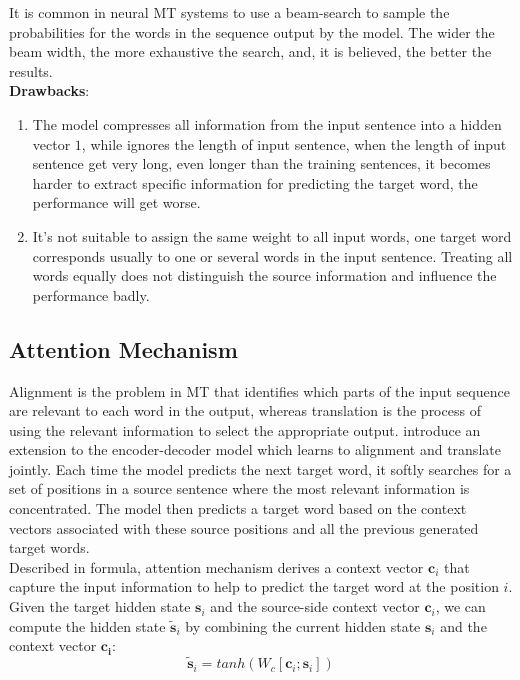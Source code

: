 It is common in neural MT systems to use a beam-search to sample the probabilities for the words in the sequence output by the model. The wider the beam width, the more exhaustive the search, and, it is believed, the better the results.\\









%
%

\textbf{Drawbacks}:
\begin{enumerate}
	\item The model compresses all information from the input sentence into a hidden vector ${1}$, while ignores the length of input sentence, when the length of input sentence get very long, even longer than the training sentences, it becomes harder to extract specific information for predicting the target word, the performance will get worse.
	\item It's not suitable to assign the same weight to all input words, one target word corresponds usually to one or several words in the input sentence. Treating all words equally does not distinguish the source information and influence the performance badly.

\end{enumerate}

\subsection{Attention Mechanism}
Alignment is the problem in MT that identifies which parts of the input sequence are relevant to each word in the output, whereas translation is the process of using the relevant information to select the appropriate output.
\cite{bahdanau2014neural} introduce an extension to the encoder-decoder model which learns to alignment and translate jointly. Each time the model predicts the next target word, it softly searches for a set of positions in a source sentence where the most relevant information is concentrated. The model then predicts a target word based on the context vectors associated with these source positions and all the previous generated target words.\\
Described in formula, attention mechanism derives a context vector ${\bm{c}_i}$ that capture the input information to help to predict the target word at the position ${i}$. Given the target hidden state ${\bm{s}_i}$ and the source-side context vector $\bm{c}_i$, we can compute the hidden state ${\tilde{\bm{s}}_i}$ by combining the current hidden state $\bm{s}_i$ and the context vector $\bm{c_i}$:
\[ \tilde{\bm{s}}_i = tanh(W_c[\bm{c}_i; \bm{s}_i])\]

